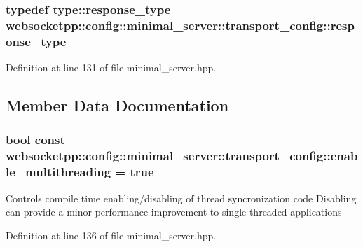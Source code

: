 \subsubsection[{response\+\_\+type}]{\setlength{\rightskip}{0pt plus 5cm}typedef {\bf type\+::response\+\_\+type} {\bf websocketpp\+::config\+::minimal\+\_\+server\+::transport\+\_\+config\+::response\+\_\+type}}\label{structwebsocketpp_1_1config_1_1minimal__server_1_1transport__config_a5d29cd10696d9a67ad9baf580db6eddf}


Definition at line 131 of file minimal\+\_\+server.\+hpp.



\subsection{Member Data Documentation}
\hypertarget{structwebsocketpp_1_1config_1_1minimal__server_1_1transport__config_a5103f390ba217818bc49b2509650c04a}{}
\subsubsection[{enable\+\_\+multithreading}]{\setlength{\rightskip}{0pt plus 5cm}bool const websocketpp\+::config\+::minimal\+\_\+server\+::transport\+\_\+config\+::enable\+\_\+multithreading = true\hspace{0.3cm}{\ttfamily [static]}}\label{structwebsocketpp_1_1config_1_1minimal__server_1_1transport__config_a5103f390ba217818bc49b2509650c04a}
Controls compile time enabling/disabling of thread syncronization code Disabling can provide a minor performance improvement to single threaded applications 

Definition at line 136 of file minimal\+\_\+server.\+hpp.

\hypertarget{structwebsocketpp_1_1config_1_1minimal__server_1_1transport__config_addfe5947be3138e84b1773b5be2ad49c}{}
